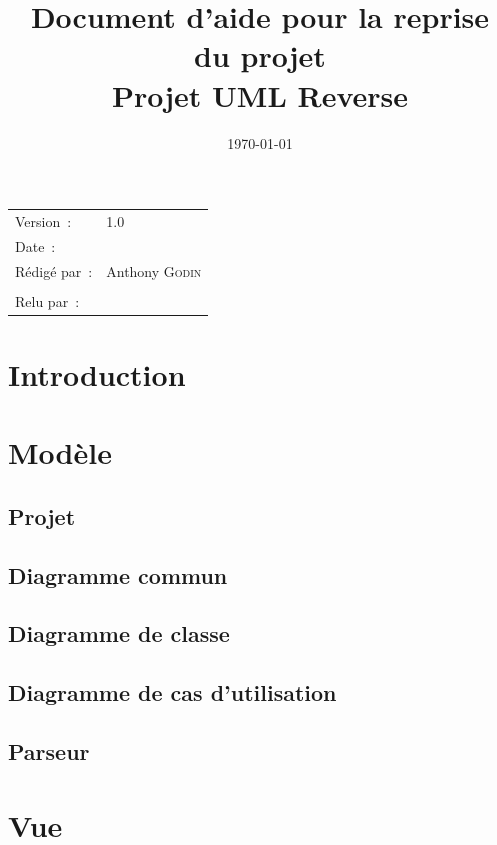 \documentclass[hidelinks, 10pt,a4paper]{article}
\title{\bfseries Document d'aide pour la reprise du projet\\Projet UML Reverse}
\begin{document}
\maketitle
\begin{center}
\begin{tabular}{ll}
  Version~: & 1.0\\[.5em]
  Date~: & \date{\today}\\[.5em]
  Rédigé par~: & Anthony \textsc{Godin}\\
               &\\[.5em]
  Relu par~:
               &\\
\end{tabular}
\end{center}

\newpage
\tableofcontents
\newpage

\section{Introduction}
\section{Modèle}
  \subsection{Projet}
  \subsection{Diagramme commun}
  \subsection{Diagramme de classe}
  \subsection{Diagramme de cas d'utilisation}
  \subsection{Parseur}
\section{Vue}
\end{document}

